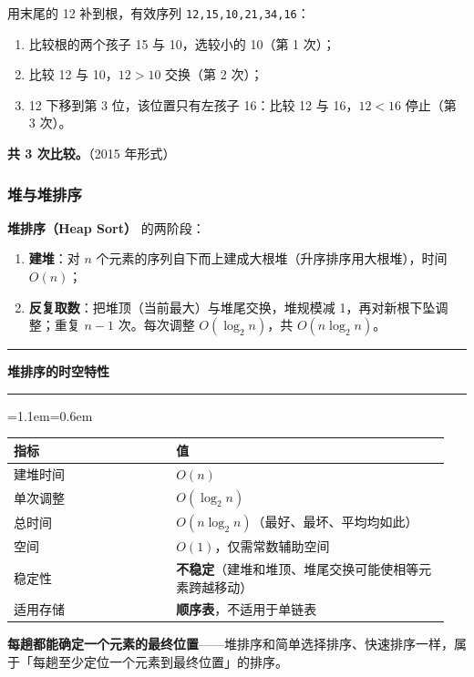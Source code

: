 \documentclass[11pt,openany,UTF8]{ctexbook}
\newcommand{\callouthead}[2]{%
  \par\addvspace{7pt}\noindent
  {\color{#1}\rule[-0.15em]{3pt}{1.05em}}\hspace{0.5em}%
  {\bfseries\color{#1}#2}\par\nobreak\vspace{-0.35em}%
  {\color{rulesep}\hrule height 0.4pt}\nobreak\vspace{0.45em}%
  \begingroup\small\setlength{\parindent}{0pt}%
  \leftskip=1.1em\rightskip=0.6em\noindent\ignorespaces}
\newcommand{\calloutend}{\par\endgroup\addvspace{7pt}}
\newenvironment{callkey}[1]{\callouthead{keybar}{#1}}{\calloutend}
\begin{document}
用末尾的 12 补到根，有效序列 \texttt{12,\allowbreak{}15,\allowbreak{}10,\allowbreak{}21,\allowbreak{}34,\allowbreak{}16}：

\begin{enumerate}
\item 比较根的两个孩子 15 与 10，选较小的 10（第 1 次）；
\item 比较 12 与 10，$12>10$ 交换（第 2 次）；
\item 12 下移到第 3 位，该位置只有左孩子 16：比较 12 与 16，$12<16$ 停止（第 3 次）。
\end{enumerate}
\textbf{共 3 次比较。}（2015 年形式）

\subsubsection{堆与堆排序}

\textbf{堆排序（Heap Sort）} 的两阶段：

\begin{enumerate}
\item \textbf{建堆}：对 $n$ 个元素的序列自下而上建成大根堆（升序排序用大根堆），时间 $O(n)$；
\item \textbf{反复取数}：把堆顶（当前最大）与堆尾交换，堆规模减 1，再对新根下坠调整；重复 $n-1$ 次。每次调整 $O(\log_2 n)$，共 $O(n\log_2 n)$。
\end{enumerate}
\begin{callkey}{堆排序的时空特性}
\begingroup\small\setlength{\tabcolsep}{4.0pt}
\begin{longtable}{@{}L{0.3553\linewidth}L{0.5904\linewidth}@{}}
\toprule
\textbf{指标} & \textbf{值} \\
\midrule
\endhead
建堆时间 & $O(n)$ \\
单次调整 & $O(\log_2 n)$ \\
总时间 & $O(n\log_2 n)$（最好、最坏、平均均如此） \\
空间 & $O(1)$，仅需常数辅助空间 \\
稳定性 & \textbf{不稳定}（建堆和堆顶、堆尾交换可能使相等元素跨越移动） \\
适用存储 & \textbf{顺序表}，不适用于单链表 \\
\bottomrule
\end{longtable}
\endgroup

\textbf{每趟都能确定一个元素的最终位置}——堆排序和简单选择排序、快速排序一样，属于「每趟至少定位一个元素到最终位置」的排序。

\end{callkey}
\end{document}
